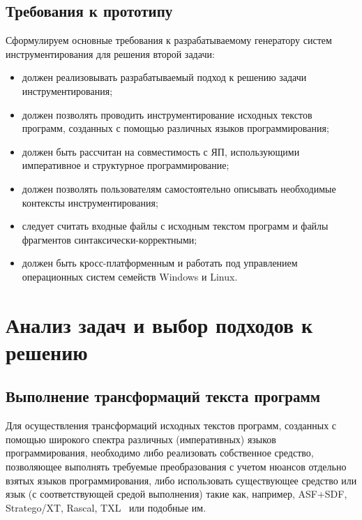 \subsection{Требования к прототипу}

Сформулируем основные требования к разрабатываемому генератору систем инструментирования для решения второй задачи:
\begin{itemize}[noitemsep]
  \item должен реализовывать разрабатываемый подход к решению задачи инструментирования;
  \item должен позволять проводить инструментирование исходных текстов программ, созданных с помощью различных языков программирования;
  \item должен быть рассчитан на совместимость с ЯП, использующими императивное и структурное программирование;
  \item должен позволять пользователям самостоятельно описывать необходимые контексты инструментирования;
  \item следует считать входные файлы с исходным текстом программ и файлы фрагментов синтаксически-корректными;
  \item должен быть кросс-платформенным и работать под управлением операционных систем семейств Windows и Linux.
\end{itemize}

\section{Анализ задач и выбор подходов к решению}

\subsection{Выполнение трансформаций текста программ}

Для осуществления трансформаций исходных текстов программ, созданных с помощью широкого спектра различных (императивных) языков программирования, необходимо либо реализовать собственное средство, позволяющее выполнять требуемые преобразования с учетом нюансов отдельно взятых языков программирования, либо использовать существующее средство или язык (с соответствующей средой выполнения) такие как, например, ASF+SDF, Stratego/XT, Rascal, TXL~\cite{cordy2009eating} или подобные им.

